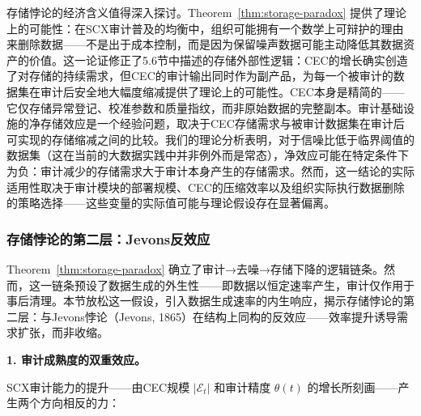 \documentclass[12pt,a4paper]{ctexart}
\theoremstyle{definition}
\theoremstyle{remark}
\begin{document}
存储悖论的经济含义值得深入探讨。Theorem~\ref{thm:storage-paradox} 提供了理论上的可能性：在SCX审计普及的均衡中，组织可能拥有一个数学上可辩护的理由来删除数据——不是出于成本控制，而是因为保留噪声数据可能主动降低其数据资产的价值。这一论证修正了5.6节中描述的存储外部性逻辑：CEC的增长确实创造了对存储的持续需求，但CEC的审计输出同时作为副产品，为每一个被审计的数据集在审计后安全地大幅度缩减提供了理论上的可能性。CEC本身是精简的——它仅存储异常登记、校准参数和质量指纹，而非原始数据的完整副本。审计基础设施的净存储效应是一个经验问题，取决于CEC存储需求与被审计数据集在审计后可实现的存储缩减之间的比较。我们的理论分析表明，对于信噪比低于临界阈值的数据集（这在当前的大数据实践中并非例外而是常态），净效应可能在特定条件下为负：审计减少的存储需求大于审计本身产生的存储需求。然而，这一结论的实际适用性取决于审计模块的部署规模、CEC的压缩效率以及组织实际执行数据删除的策略选择——这些变量的实际值可能与理论假设存在显著偏离。

\subsubsection{存储悖论的第二层：Jevons反效应}

Theorem~\ref{thm:storage-paradox} 确立了审计→去噪→存储下降的逻辑链条。然而，这一链条预设了数据生成的外生性——即数据以恒定速率产生，审计仅作用于事后清理。本节放松这一假设，引入数据生成速率的内生响应，揭示存储悖论的第二层：与Jevons悖论（Jevons, 1865）在结构上同构的反效应——效率提升诱导需求扩张，而非收缩。

\medskip
\noindent\textbf{1. 审计成熟度的双重效应。}

SCX审计能力的提升——由CEC规模 $|\mathcal{E}_t|$ 和审计精度 $\theta(t)$ 的增长所刻画——产生两个方向相反的力：
\end{document}
